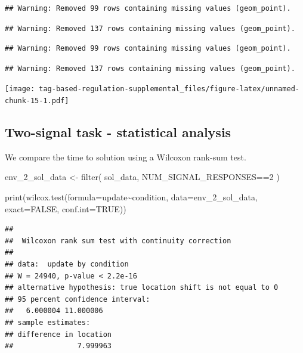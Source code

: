 \documentclass[
]{book}
\newenvironment{Shaded}{\begin{snugshade}}{\end{snugshade}}
\newcommand{\AttributeTok}[1]{\textcolor[rgb]{0.77,0.63,0.00}{#1}}
\newcommand{\ConstantTok}[1]{\textcolor[rgb]{0.00,0.00,0.00}{#1}}
\newcommand{\DecValTok}[1]{\textcolor[rgb]{0.00,0.00,0.81}{#1}}
\newcommand{\FunctionTok}[1]{\textcolor[rgb]{0.00,0.00,0.00}{#1}}
\newcommand{\NormalTok}[1]{#1}
\newcommand{\OtherTok}[1]{\textcolor[rgb]{0.56,0.35,0.01}{#1}}
\newcommand{\SpecialCharTok}[1]{\textcolor[rgb]{0.00,0.00,0.00}{#1}}
\begin{document}
\begin{verbatim}
## Warning: Removed 99 rows containing missing values (geom_point).
\end{verbatim}

\begin{verbatim}
## Warning: Removed 137 rows containing missing values (geom_point).
\end{verbatim}

\begin{verbatim}
## Warning: Removed 99 rows containing missing values (geom_point).
\end{verbatim}

\begin{verbatim}
## Warning: Removed 137 rows containing missing values (geom_point).
\end{verbatim}

\texttt{[image: tag-based-regulation-supplemental\_files/figure-latex/unnamed-chunk-15-1.pdf]}

\hypertarget{two-signal-task---statistical-analysis}{%
\subsection{Two-signal task - statistical analysis}\label{two-signal-task---statistical-analysis}}

We compare the time to solution using a Wilcoxon rank-sum test.

\begin{Shaded}
\begin{Highlighting}[]
\NormalTok{env\_2\_sol\_data }\OtherTok{\textless{}{-}} \FunctionTok{filter}\NormalTok{(}
\NormalTok{  sol\_data,}
\NormalTok{  NUM\_SIGNAL\_RESPONSES}\SpecialCharTok{==}\DecValTok{2}
\NormalTok{)}

\FunctionTok{print}\NormalTok{(}\FunctionTok{wilcox.test}\NormalTok{(}\AttributeTok{formula=}\NormalTok{update}\SpecialCharTok{\textasciitilde{}}\NormalTok{condition, }\AttributeTok{data=}\NormalTok{env\_2\_sol\_data, }\AttributeTok{exact=}\ConstantTok{FALSE}\NormalTok{, }\AttributeTok{conf.int=}\ConstantTok{TRUE}\NormalTok{))}
\end{Highlighting}
\end{Shaded}

\begin{verbatim}
## 
##  Wilcoxon rank sum test with continuity correction
## 
## data:  update by condition
## W = 24940, p-value < 2.2e-16
## alternative hypothesis: true location shift is not equal to 0
## 95 percent confidence interval:
##   6.000004 11.000006
## sample estimates:
## difference in location 
##               7.999963
\end{verbatim}
\end{document}

